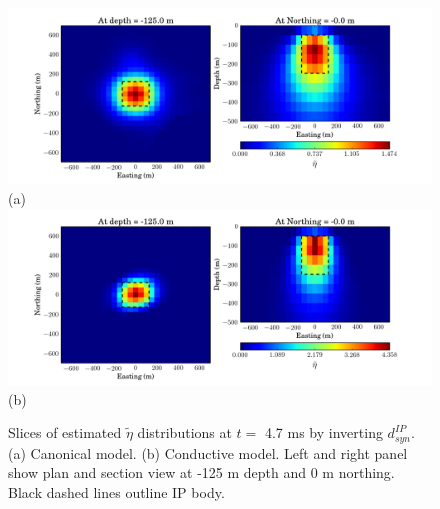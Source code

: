 \documentclass[a4paper, 11pt]{article}
\newcommand{\peta}{\tilde{\eta}}
\begin{document}
\begin{figure}[htb]
  \centering
  \includegraphics[width=\textwidth]{figures/synthetic/PetaCase1_syn_ch38.png}\\
  (a)
  \includegraphics[width=\textwidth]{figures/synthetic/PetaCase2_syn_ch38.png}\\
  (b)
  \caption{Slices of estimated $\peta$ distributions at $t = $ 4.7 ms by inverting $d^{IP}_{syn}$. (a) Canonical model. (b)  Conductive model. Left and right panel show plan and section view at -125 m depth and 0 m northing. Black dashed lines outline IP body. }
  \label{F: Peta_dipsyn_ch38}
\end{figure}
\end{document}

